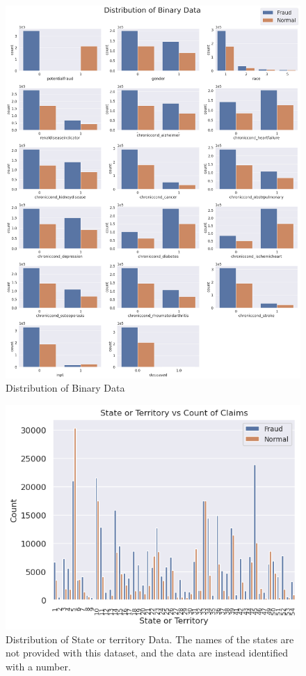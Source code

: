 \documentclass[twoside,11pt]{article}
\begin{document}
\begin{figure}[bp!]
  \centering
  \includegraphics[width=\textwidth]{./img/binary.png}
  \caption{Distribution of Binary Data}
  \label{fig:binary}

\end{figure}
\begin{figure}[bp!]
  \centering
  \includegraphics[width=\textwidth]{./img/state.png}
  \caption{Distribution of State or territory Data. The 
  names of the states are not
  provided with this dataset, and the data are instead identified with a number.}
\end{figure}
\end{document}
